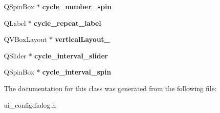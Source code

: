 \begin{DoxyCompactItemize}
\item 
\hypertarget{class_ui___dialog_a0be189bc5eb8101f29b338b860879102}{
QSpinBox $\ast$ {\bfseries cycle\_\-number\_\-spin}}
\label{class_ui___dialog_a0be189bc5eb8101f29b338b860879102}

\item 
\hypertarget{class_ui___dialog_a105ac15a30b525f4d74b483428c13eb6}{
QLabel $\ast$ {\bfseries cycle\_\-repeat\_\-label}}
\label{class_ui___dialog_a105ac15a30b525f4d74b483428c13eb6}

\item 
\hypertarget{class_ui___dialog_a45848d5ddee2a1fec7b25bd305f0b2a8}{
QVBoxLayout $\ast$ {\bfseries verticalLayout\_}}
\label{class_ui___dialog_a45848d5ddee2a1fec7b25bd305f0b2a8}

\item 
\hypertarget{class_ui___dialog_ad76be9e0352482970223593beb77ce5c}{
QSlider $\ast$ {\bfseries cycle\_\-interval\_\-slider}}
\label{class_ui___dialog_ad76be9e0352482970223593beb77ce5c}

\item 
\hypertarget{class_ui___dialog_a48ce2da4a2452ed43632629417fad134}{
QSpinBox $\ast$ {\bfseries cycle\_\-interval\_\-spin}}
\label{class_ui___dialog_a48ce2da4a2452ed43632629417fad134}

\end{DoxyCompactItemize}


The documentation for this class was generated from the following file:\begin{DoxyCompactItemize}
\item 
ui\_\-configdialog.h\end{DoxyCompactItemize}
